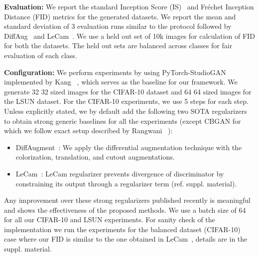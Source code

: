 \documentclass[runningheads,table]{llncs}
\begin{document}
\noindent\textbf{Evaluation: } We report the standard Inception Score (IS)~\cite{salimans2016improved} and Fr\'echet Inception Distance (FID) metrics for the generated datasets. We report the mean and standard deviation of 3 evaluation runs similar to the protocol followed by DiffAug~\cite{zhao2020differentiable} and LeCam~\cite{tseng2021regularizing}. We use a held out set of 10k images for calculation of FID for both the datasets. The held out sets are balanced across classes for fair evaluation of each class. 

\noindent\textbf{Configuration:} We perform experiments by using PyTorch-StudioGAN implemented  by Kang \etal~\cite{kang2020contrastive}, which serves as the baseline for our framework. We generate 32  32 sized images for the CIFAR-10 dataset and 64  64 sized images for the LSUN dataset. For the CIFAR-10 experiments, we use 5  steps for each  step. Unless explicitly stated, we by default add the following two SOTA regularizers to obtain strong generic baselines for all the experiments (except CBGAN for which we follow exact setup described by Rangwani \etal~\cite{rangwani2021class}):
\begin{itemize}
\itemsep0em
    \item {DiffAugment~\cite{zhao2020differentiable}:} We apply the differential augmentation technique with the colorization, translation, and cutout augmentations.
    \item {LeCam~\cite{tseng2021regularizing}}: LeCam regularizer prevents divergence of discriminator  by constraining its output through a regularizer term  (ref. suppl. material).
\end{itemize}
Any improvement over these strong regularizers published recently is meaningful and shows the effectiveness of the proposed methods. We use a batch size of 64 for all our CIFAR-10 and LSUN experiments. For sanity check of the implementation we run the experiments for the balanced dataset (CIFAR-10) case where our FID is similar to the one obtained in LeCam~\cite{tseng2021regularizing}, details are in the suppl. material.
\end{document}
